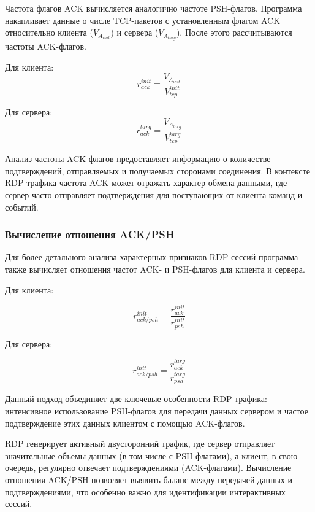 \documentclass[bachelor, och, coursework]{SCWorks}
\begin{document}
Частота флагов ACK вычисляется аналогично частоте PSH-флагов. Программа накапливает данные о числе TCP-пакетов с установленным 
флагом ACK относительно клиента ($V_{A_{init}}$) и сервера ($V_{A_{targ}}$). После этого рассчитываются частоты ACK-флагов.

Для клиента:
  \begin{equation}
    r_{ack}^{init} = \frac{V_{A_{init}}}{V_{tcp}^{init}}
  \end{equation}

Для сервера:
  \begin{equation}
    r_{ack}^{targ} = \frac{V_{A_{targ}}}{V_{tcp}^{targ}}
  \end{equation}

  Анализ частоты ACK-флагов предоставляет информацию о количестве подтверждений, отправляемых и получаемых сторонами 
  соединения. В контексте RDP трафика частота ACK может отражать характер обмена данными, где сервер часто отправляет 
  подтверждения для поступающих от клиента команд и событий.

\subsubsection{Вычисление отношения ACK/PSH}

Для более детального анализа характерных признаков RDP-сессий программа также вычисляет отношения частот ACK- и PSH-флагов 
для клиента и сервера.

Для клиента:

\begin{equation}
  r_{ack/psh}^{init} = \frac{r_{ack}^{init}}{r_{psh}^{init}}
\end{equation}

Для сервера:

\begin{equation}
  r_{ack/psh}^{init} = \frac{r_{ack}^{targ}}{r_{psh}^{targ}}
\end{equation}

Данный подход объединяет две ключевые особенности RDP-трафика: интенсивное использование PSH-флагов для передачи данных сервером и 
частое подтверждение этих данных клиентом с помощью ACK-флагов.

RDP генерирует активный двусторонний трафик, где сервер отправляет значительные объемы данных (в том числе с PSH-флагами), 
а клиент, в свою очередь, регулярно отвечает подтверждениями (ACK-флагами). Вычисление отношения ACK/PSH позволяет выявить 
баланс между передачей данных и подтверждениями, что особенно важно для идентификации интерактивных сессий.
\end{document}
